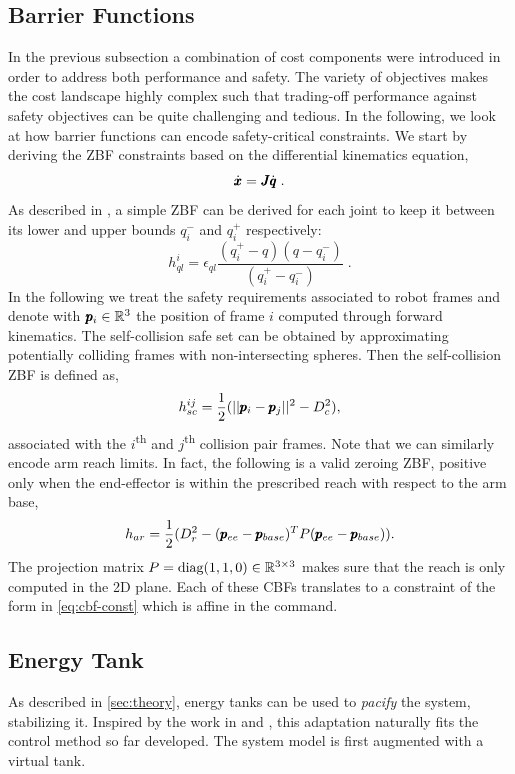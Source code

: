 \subsection{Barrier Functions}
In the previous subsection a combination of cost components were introduced in order to address both performance and safety. The variety of objectives makes the cost landscape highly complex such that trading-off performance against safety objectives can be quite challenging and tedious. In the following, we look at how barrier functions can encode safety-critical constraints. We start by deriving the ZBF constraints based on the differential kinematics equation,
\begin{equation}
    \dot{\pmb{x}} = \pmb{J} \dot{\pmb{q}}\;.
\end{equation}
As described in \cite{benzi2021optimization}, a simple ZBF can be derived for each joint to keep it between its lower and upper bounds $q_i^-$ and $q_i^+$ respectively:
\begin{equation}
h_{ql}^i = \epsilon_{ql} \frac{(q_i^+ - q)(q - q_i^-)}{(q_i^+ - q_i^-)}\;.
\end{equation}
In the following we treat the safety requirements associated to robot frames and denote with $\pmb{p}_{i} \in \mathbb{R}^{3}$ the position of frame $i$ computed through forward kinematics.  
The self-collision safe set can be obtained by approximating potentially colliding frames with non-intersecting spheres. Then the self-collision ZBF is defined as,
\begin{equation}
    h_{sc}^{ij} = \frac{1}{2}(||\pmb{p}_i - \pmb{p}_j||^2 - D_c^2),
\end{equation}
associated with the $i$\textsuperscript{th}  and $j$\textsuperscript{th} collision pair frames. Note that we can similarly encode arm reach limits. In fact, the following is a valid zeroing ZBF, positive only when the end-effector is within the prescribed reach with respect to the arm base,
\begin{equation}
    h_{ar} = \frac{1}{2}(D_r^2 - (\pmb{p}_{ee} - \pmb{p}_{base})^T P (\pmb{p}_{ee} - \pmb{p}_{base}) ).
\end{equation}
The projection matrix $P = \text{diag}(1, 1, 0) \in \mathbb{R}^{3 \times 3}$ makes sure that the reach is only computed in the 2D plane. Each of these CBFs translates to a constraint of the form in \eqn \ref{eq:cbf-const} which is affine in the command. 

\subsection{Energy Tank}
As described in \sect \ref{sec:theory}, energy tanks can be used to \emph{pacify} the system, stabilizing it. Inspired by the work in \cite{benzi2021optimization} and \cite{shahriari2018valve}, this adaptation naturally fits the control method so far developed. The system model is first augmented with a virtual tank. 

